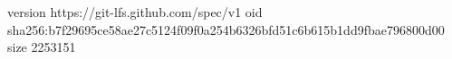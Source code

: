 version https://git-lfs.github.com/spec/v1
oid sha256:b7f29695ce58ae27c5124f09f0a254b6326bfd51c6b615b1dd9fbae796800d00
size 2253151
